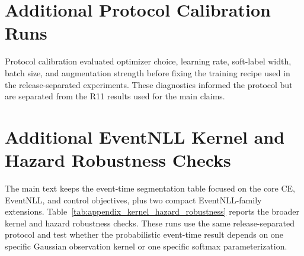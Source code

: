 \documentclass[12pt]{article}
\begin{document}
\begin{table}[!t]
\centering
\caption{Unwrapped external-backbone sanity checks. ``Wrapped'' means that the model receives the same per-window channel standardization used by our compact baselines. These checks diagnose scale sensitivity; the wrapped variants are the fair external comparisons used in the main results.}
\label{tab:appendix_unwrapped_external}
\scriptsize
\setlength{\tabcolsep}{3pt}
\renewcommand{\arraystretch}{1.12}
\end{table}

\section{Additional Protocol Calibration Runs}

Protocol calibration evaluated optimizer choice, learning rate, soft-label width, batch size, and augmentation strength before fixing the training recipe used in the release-separated experiments. These diagnostics informed the protocol but are separated from the R11 results used for the main claims.

\section{Additional EventNLL Kernel and Hazard Robustness Checks}

The main text keeps the event-time segmentation table focused on the core CE, EventNLL, and control objectives, plus two compact EventNLL-family extensions. Table~\ref{tab:appendix_kernel_hazard_robustness} reports the broader kernel and hazard robustness checks. These runs use the same release-separated protocol and test whether the probabilistic event-time result depends on one specific Gaussian observation kernel or one specific softmax parameterization.
\end{document}
